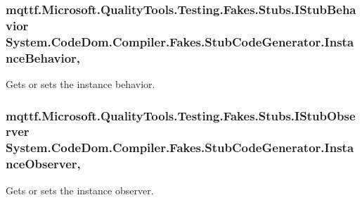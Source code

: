 \hypertarget{class_system_1_1_code_dom_1_1_compiler_1_1_fakes_1_1_stub_code_generator_a0cff5cf003d0c7792640239de935926e}{
\subsubsection[{Instance\-Behavior}]{\setlength{\rightskip}{0pt plus 5cm}mqttf.\-Microsoft.\-Quality\-Tools.\-Testing.\-Fakes.\-Stubs.\-I\-Stub\-Behavior System.\-Code\-Dom.\-Compiler.\-Fakes.\-Stub\-Code\-Generator.\-Instance\-Behavior\hspace{0.3cm}{\ttfamily [get]}, {\ttfamily [set]}}}\label{class_system_1_1_code_dom_1_1_compiler_1_1_fakes_1_1_stub_code_generator_a0cff5cf003d0c7792640239de935926e}


Gets or sets the instance behavior.

\hypertarget{class_system_1_1_code_dom_1_1_compiler_1_1_fakes_1_1_stub_code_generator_a2b3ef680fe6ef51106d22bf774ead5e9}{
\subsubsection[{Instance\-Observer}]{\setlength{\rightskip}{0pt plus 5cm}mqttf.\-Microsoft.\-Quality\-Tools.\-Testing.\-Fakes.\-Stubs.\-I\-Stub\-Observer System.\-Code\-Dom.\-Compiler.\-Fakes.\-Stub\-Code\-Generator.\-Instance\-Observer\hspace{0.3cm}{\ttfamily [get]}, {\ttfamily [set]}}}\label{class_system_1_1_code_dom_1_1_compiler_1_1_fakes_1_1_stub_code_generator_a2b3ef680fe6ef51106d22bf774ead5e9}


Gets or sets the instance observer.

